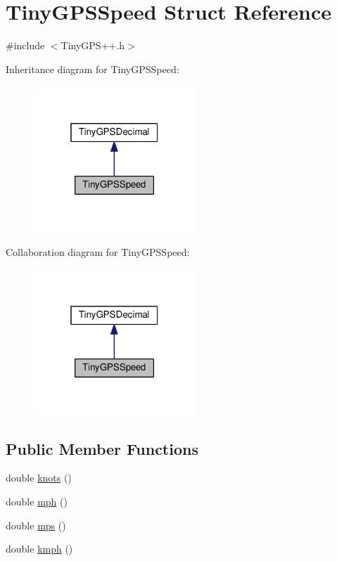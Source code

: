 \hypertarget{struct_tiny_g_p_s_speed}{}\section{Tiny\+G\+P\+S\+Speed Struct Reference}
\label{struct_tiny_g_p_s_speed}


{\ttfamily \#include $<$Tiny\+G\+P\+S++.\+h$>$}



Inheritance diagram for Tiny\+G\+P\+S\+Speed\+:\nopagebreak
\begin{figure}[H]
\begin{center}
\leavevmode
\includegraphics[width=172pt]{struct_tiny_g_p_s_speed__inherit__graph}
\end{center}
\end{figure}


Collaboration diagram for Tiny\+G\+P\+S\+Speed\+:\nopagebreak
\begin{figure}[H]
\begin{center}
\leavevmode
\includegraphics[width=172pt]{struct_tiny_g_p_s_speed__coll__graph}
\end{center}
\end{figure}
\subsection*{Public Member Functions}
\begin{DoxyCompactItemize}
\item 
double \hyperlink{struct_tiny_g_p_s_speed_aa3a38ce4ece3d8062c794b73f260395e}{knots} ()
\item 
double \hyperlink{struct_tiny_g_p_s_speed_a1809120167961ea9a85e860a964b1c6e}{mph} ()
\item 
double \hyperlink{struct_tiny_g_p_s_speed_aacee536241e810cdf4ba7846d6c202cb}{mps} ()
\item 
double \hyperlink{struct_tiny_g_p_s_speed_a7fee3c8f9f2fcc5f4a517bd6108f79dd}{kmph} ()
\end{DoxyCompactItemize}


